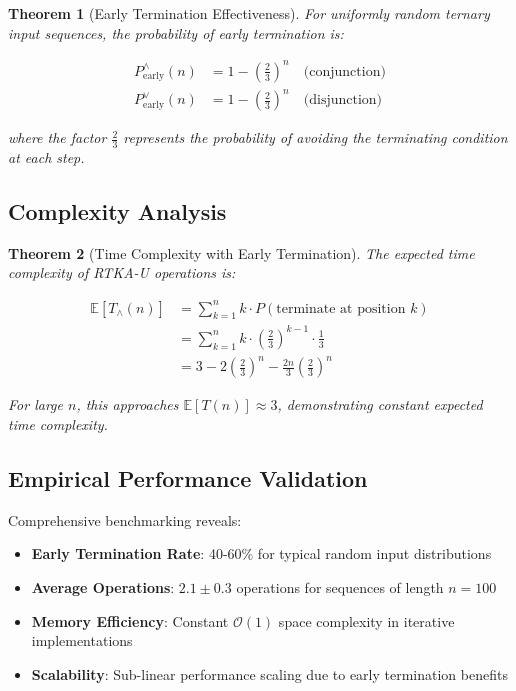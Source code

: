 \documentclass[11pt,a4paper]{article}
\newtheorem{theorem}{Theorem}
\begin{document}
\begin{theorem}[Early Termination Effectiveness]
For uniformly random ternary input sequences, the probability of early termination is:

\begin{align}
P_{\text{early}}^{\land}(n) &= 1 - \left(\frac{2}{3}\right)^n \quad \text{(conjunction)} \\
P_{\text{early}}^{\lor}(n) &= 1 - \left(\frac{2}{3}\right)^n \quad \text{(disjunction)}
\end{align}

where the factor $\frac{2}{3}$ represents the probability of avoiding the terminating condition at each step.
\end{theorem}

\subsection{Complexity Analysis}

\begin{theorem}[Time Complexity with Early Termination]
The expected time complexity of RTKA-U operations is:

\begin{align}
\mathbb{E}[T_{\land}(n)] &= \sum_{k=1}^n k \cdot P(\text{terminate at position } k) \\
&= \sum_{k=1}^n k \cdot \left(\frac{2}{3}\right)^{k-1} \cdot \frac{1}{3} \\
&= 3 - 2\left(\frac{2}{3}\right)^n - \frac{2n}{3}\left(\frac{2}{3}\right)^n
\end{align}

For large $n$, this approaches $\mathbb{E}[T(n)] \approx 3$, demonstrating constant expected time complexity.
\end{theorem}

\subsection{Empirical Performance Validation}

Comprehensive benchmarking reveals:

\begin{itemize}
\item \textbf{Early Termination Rate}: 40-60\% for typical random input distributions
\item \textbf{Average Operations}: $2.1 \pm 0.3$ operations for sequences of length $n = 100$
\item \textbf{Memory Efficiency}: Constant $\mathcal{O}(1)$ space complexity in iterative implementations
\item \textbf{Scalability}: Sub-linear performance scaling due to early termination benefits
\end{itemize}
\end{document}
